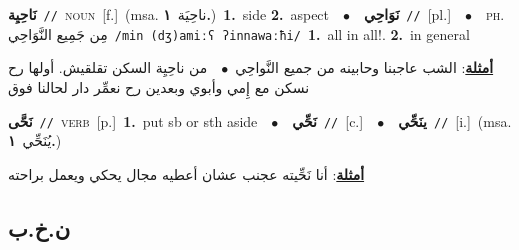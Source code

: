 \documentclass[10pt,a4paper,twoside]{article} %
\begin{document}
\begin{multicols}{2}
{\setlength\topsep{0pt}\textbf{\foreignlanguage{arabic}{نَاحِيِة}}\ {\color{gray}\texttt{//}\color{black}}\ \textsc{noun}\ [f.]\ \color{gray}(msa. \foreignlanguage{arabic}{ناحِيَة}~\foreignlanguage{arabic}{\textbf{١.}})\color{black}\ \textbf{1.}~side  \textbf{2.}~aspect\ \ $\bullet$\ \ \setlength\topsep{0pt}\textbf{\foreignlanguage{arabic}{نَوَاحِي}}\ {\color{gray}\texttt{//}\color{black}}\ [pl.]\ \ $\bullet$\ \ \textsc{ph.} \color{gray} \foreignlanguage{arabic}{مِن جَمِيع النَّوَاحِي}\color{black}\ {\color{gray}\texttt{/{\sffamily min (dʒ)amiːʕ ʔinnawaːħi}/}\color{black}}\ \textbf{1.}~all in all!.  \textbf{2.}~in general\  \begin{flushright}\color{gray}\foreignlanguage{arabic}{\textbf{\underline{\foreignlanguage{arabic}{أمثلة}}}: الشب عاجبنا وحابينه من جميع النَّواحِي\ $\bullet$\ \  من ناحِيِة السكن تقلقيش. أولها رح نسكن مع إِمي وأبوي وبعدين رح نعمِّر دار لحالنا فوق}\end{flushright}\color{black}} \vspace{2mm}

{\setlength\topsep{0pt}\textbf{\foreignlanguage{arabic}{نَحَّى}}\ {\color{gray}\texttt{//}\color{black}}\ \textsc{verb}\ [p.]\ \textbf{1.}~put sb or sth aside\ \ $\bullet$\ \ \setlength\topsep{0pt}\textbf{\foreignlanguage{arabic}{نَحِّي}}\ {\color{gray}\texttt{//}\color{black}}\ [c.]\ \ $\bullet$\ \ \setlength\topsep{0pt}\textbf{\foreignlanguage{arabic}{ينَحِّي}}\ {\color{gray}\texttt{//}\color{black}}\ [i.]\ \color{gray}(msa. \foreignlanguage{arabic}{يُنَحِّي}~\foreignlanguage{arabic}{\textbf{١.}})\color{black}\  \begin{flushright}\color{gray}\foreignlanguage{arabic}{\textbf{\underline{\foreignlanguage{arabic}{أمثلة}}}: أنا نَحِّيته عجنب عشان أعطيه مجال يحكي ويعمل براحته}\end{flushright}\color{black}} \vspace{2mm}

\vspace{-3mm}
\subsection*{\color{blue}\foreignlanguage{arabic}{ن.خ.ب}\color{blue}{}} 


\end{multicols}
\end{document}
